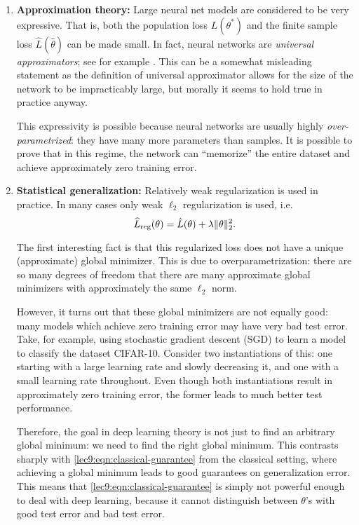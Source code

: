 \begin{enumerate} 
\item {\bf Approximation theory:} Large neural net models are considered to be very expressive. That is, both the population loss $L(\theta^*)$ and the finite sample loss $\hat{L}(\hat\theta)$ can be made small. In fact, neural networks are \textit{universal approximators}; see for example \cite{hornik1991}. This can be a somewhat misleading statement as the definition of universal approximator allows for the size of the network to be impracticably large, but morally it seems to hold true in practice anyway.
        
This expressivity is possible because neural networks are usually highly \textit{over-parametrized}: they have many more parameters than samples. It is possible to prove that in this regime, the network can ``memorize'' the entire dataset and achieve approximately zero training error.
    
\item {\bf Statistical generalization:} Relatively weak regularization is used in practice. In many cases only weak $\ell_2$ regularization is used, i.e.
\begin{equation}
\widehat{L}_{\textup{reg}}(\theta)=\hat{L}(\theta)+\lambda\|\theta\|_2^2.
\end{equation}
    
The first interesting fact is that this regularized loss does not have a unique (approximate) global minimizer. This is due to overparametrization: there are so many degrees of freedom that there are many approximate global minimizers with approximately the same $\ell_2$ norm.
    
However, it turns out that these global minimizers are not equally good: many models which achieve zero training error may have very bad test error. Take, for example, using stochastic gradient descent (SGD) to learn a model to classify the dataset CIFAR-10. Consider two instantiations of this: one starting with a large learning rate and slowly decreasing it, and one with a small learning rate throughout. Even though both instantiations result in approximately zero training error, the former leads to much better test performance.

Therefore, the goal in deep learning theory is not just to find an arbitrary global minimum: we need to find the right global minimum. This contrasts sharply with \eqref{lec9:eqn:classical-guarantee} from the classical setting, where achieving a global minimum leads to good guarantees on generalization error. This means that \eqref{lec9:eqn:classical-guarantee} is simply not powerful enough to deal with deep learning, because it cannot distinguish between $\theta$'s with good test error and bad test error.


\end{enumerate}
